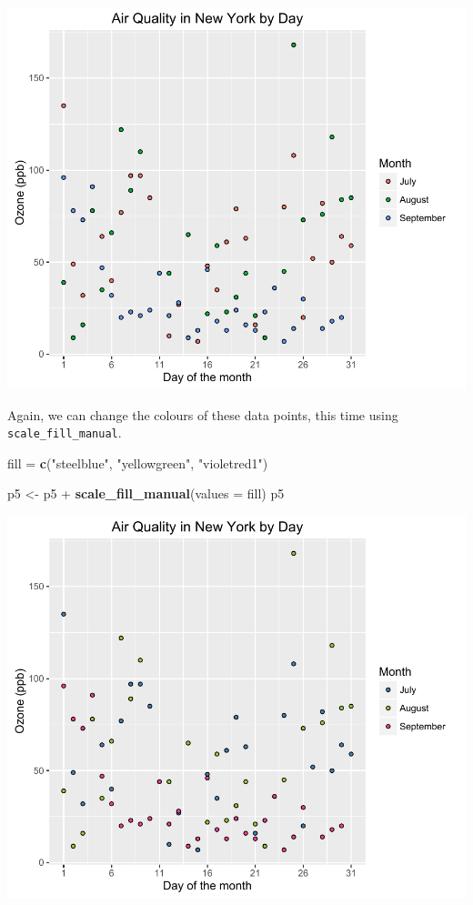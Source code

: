 \documentclass[]{article}
\newenvironment{Shaded}{\begin{snugshade}}{\end{snugshade}}
\newcommand{\KeywordTok}[1]{\textcolor[rgb]{0.13,0.29,0.53}{\textbf{{#1}}}}
\newcommand{\DataTypeTok}[1]{\textcolor[rgb]{0.13,0.29,0.53}{{#1}}}
\newcommand{\StringTok}[1]{\textcolor[rgb]{0.31,0.60,0.02}{{#1}}}
\newcommand{\NormalTok}[1]{{#1}}
\begin{document}
\begin{center}\includegraphics{5_Scatter_Plots_pdf/scatter_9-1} \end{center}

Again, we can change the colours of these data points, this time using
\texttt{scale\_fill\_manual}.

\begin{Shaded}
\begin{Highlighting}[]
\NormalTok{fill =}\StringTok{ }\KeywordTok{c}\NormalTok{(}\StringTok{"steelblue"}\NormalTok{, }\StringTok{"yellowgreen"}\NormalTok{, }\StringTok{"violetred1"}\NormalTok{)}

\NormalTok{p5 <-}\StringTok{ }\NormalTok{p5 +}\StringTok{ }\KeywordTok{scale_fill_manual}\NormalTok{(}\DataTypeTok{values =} \NormalTok{fill)}
\NormalTok{p5}
\end{Highlighting}
\end{Shaded}

\begin{center}\includegraphics{5_Scatter_Plots_pdf/scatter_10-1} \end{center}
\end{document}
